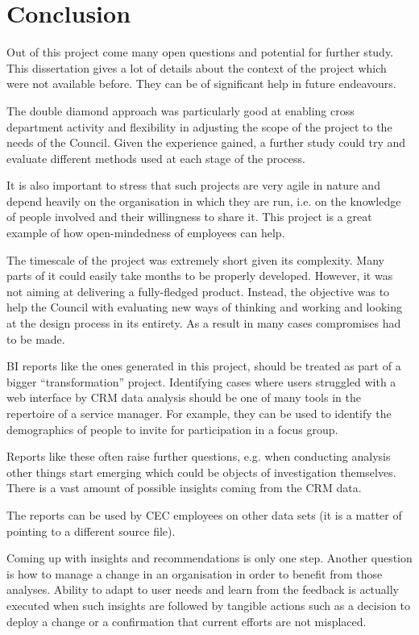 
\chapter{Conclusion}

Out of this project come many open questions and potential for further study. This dissertation gives a lot of details about the context of the project which were not available before. They can be of significant help in future endeavours.

The double diamond approach was particularly good at enabling cross department activity and flexibility in adjusting the scope of the project to the needs of the Council. Given the experience gained, a further study could try and evaluate different methods used at each stage of the process.

It is also important to stress that such projects are very agile in nature and depend heavily on the organisation in which they are run, i.e. on the knowledge of people involved and their willingness to share it. This project is a great example of how open-mindedness of employees can help.

The timescale of the project was extremely short given its complexity. Many parts of it could easily take months to be properly developed. However, it was not aiming at delivering a fully-fledged product. Instead, the objective was to help the Council with evaluating new ways of thinking and working and looking at the design process in its entirety. As a result in many cases compromises had to be made.

BI reports like the ones generated in this project, should be treated as part of a bigger “transformation” project. Identifying cases where users struggled with a web interface by CRM data analysis should be one of many tools in the repertoire of a service manager. For example, they can be used to identify the demographics of people to invite for participation in a focus group.

Reports like these often raise further questions, e.g. when conducting analysis other things start emerging which could be objects of investigation themselves. There is a vast amount of possible insights coming from the CRM data.

The reports can be used by CEC employees on other data sets (it is a matter of pointing to a different source file). 

Coming up with insights and recommendations is only one step. Another question is how to manage a change in an organisation in order to benefit from those analyses. Ability to adapt to user needs and learn from the feedback is actually executed when such insights are followed by tangible actions such as a decision to deploy a change or a confirmation that current efforts are not misplaced.